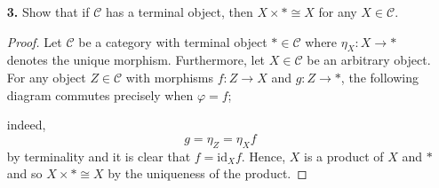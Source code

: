 \documentclass[ 12pt ]{article}
\begin{document}
\begin{enumerate}
\begin{proof}
			Conversely, let $\Theta : \mathsf{Set}^\mathsf{op} \to \mathsf{Mon}$ be a functor such that $よ_X = \Theta U$. Since $U : \mathsf{Mon} \to \mathsf{Set}$ is the forgetful functor, it must hold that $\Theta Y = \mathsf{Set}(Y, X)$ and $\Theta f = - \cdot f$, similar to the Yoneda embedding $よ_X$. Consider the singleton set $\ast \in \mathsf{Set}$ and, more particularly, its image $\Theta \ast = \mathsf{Set}(\ast, X) \in \mathsf{Mon}$. It must hold that $\mathsf{Set}(\ast, X)$ holds a monoid structure, let $\cdot : \mathsf{Set}(\ast, X) \times \mathsf{Set}(\ast, X) \to \mathsf{Set}(\ast, X)$ denote its operation and $\eta : \ast \to X$ its identity. We define an operation on $X$ by applying $\cdot$ in the following manner: $$f \ast \cdot g \ast = (f \cdot g) \ast.$$ Observe that $$(f \ast \cdot g \ast) \cdot h \ast = (f \cdot g) \ast \cdot h \ast = ((f \cdot g) \cdot h) \ast = (f \cdot (g \cdot h)) \ast = f \ast \cdot (g \cdot h) \ast = f \ast \cdot (g \ast \cdot h \ast)$$ illustrating that $\cdot$ is associative on $X$ via its associativity on $\mathsf{Set}(\ast, X)$. As for unitality, we can see that $$f \ast \cdot \eta \ast = (f \cdot \eta) \ast = f \ast = ( \eta \cdot f) \ast = \eta \ast \cdot f \ast$$ and so $\eta \ast$ is the identity of $X$. Furthermore, $X$ is a monoid by definition. Provided that monoids, both algebraic and categorical, coincide in $\mathsf{Set}$, this proves the claim.
		\end{proof}


	\item[\textbf{3.}] Show that if $\mathscr{C}$ has a terminal object, then $X \times \ast \cong X$ for any $X \in \mathscr{C}$.

		\begin{proof}
			Let $\mathscr{C}$ be a category with terminal object $\ast \in \mathscr{C}$ where $\eta_X : X \to \ast$ denotes the unique morphism. Furthermore, let $X \in \mathscr{C}$ be an arbitrary object. For any object $Z \in \mathscr{C}$ with morphisms $f : Z \to X$ and $g : Z \to \ast$, the following diagram commutes precisely when $\varphi = f$;
			\begin{center}
			\end{center}
			indeed, $$g = \eta_Z = \eta_X f$$ by terminality and it is clear that $f = \mathrm{id}_X f$. Hence, $X$ is a product of $X$ and $\ast$ and so $X \times \ast \cong X$ by the uniqueness of the product.
		\end{proof}



\end{enumerate}
\end{document}
